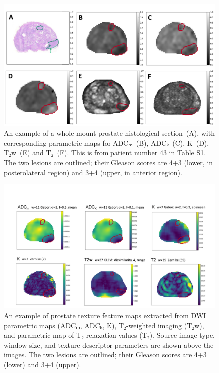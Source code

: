 \begin{figure}[ht]

\centering \includegraphics[width=1.0\textwidth]{figures/fig2}

\caption{An example of a whole mount prostate histological section~(A), with
corresponding parametric maps for ADCₘ~(B), ADCₖ~(C), K~(D), T₂w~(E)
and T₂~(F). This is from patient number 43 in Table S1. The two lesions are
outlined; their Gleason scores are 4+3 (lower, in posterolateral region) and 3+4
(upper, in anterior region).}\label{fig:pmap}

\end{figure}


\begin{figure}[ht]

\centering \includegraphics[width=1.0\textwidth]{figures/fig3}

\caption{An example of prostate texture feature maps extracted from DWI
parametric maps (ADCₘ, ADCₖ, K), T₂-weighted imaging (T₂w), and parametric map
of T₂ relaxation values (T₂). Source image type, window size, and texture
descriptor parameters are shown above the images. The two lesions are outlined;
their Gleason scores are 4+3 (lower) and 3+4 (upper).}\label{fig:tmap}

\end{figure}



